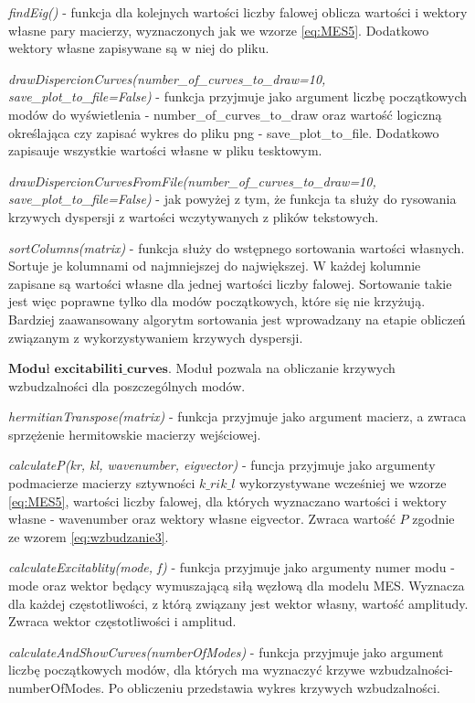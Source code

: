 \vspace {3mm}
\textit{findEig()} - funkcja dla kolejnych wartości liczby falowej oblicza wartości i wektory własne pary macierzy, wyznaczonych jak we wzorze \ref{eq:MES5}. Dodatkowo wektory własne zapisywane są w niej do pliku.

\vspace {3mm}
\textit{drawDispercionCurves(number\_of\_curves\_to\_draw=10, save\_plot\_to\_file=False)} - funkcja przyjmuje jako argument liczbę początkowych modów do wyświetlenia - number\_of\_curves\_to\_draw oraz wartość logiczną określająca czy zapisać wykres do pliku png - save\_plot\_to\_file. Dodatkowo zapisauje wszystkie wartości własne w pliku tesktowym.

\vspace {3mm}
\textit{drawDispercionCurvesFromFile(number\_of\_curves\_to\_draw=10, save\_plot\_to\_file=False)} - jak powyżej z tym, że funkcja ta służy do rysowania krzywych dyspersji z wartości wczytywanych z plików tekstowych.

\vspace {3mm}
\textit{sortColumns(matrix)} - funkcja służy do wstępnego sortowania wartości własnych. Sortuje je kolumnami od najmniejszej do największej. W każdej kolumnie zapisane są wartości własne dla jednej wartości liczby falowej. Sortowanie takie jest więc poprawne tylko dla modów początkowych, które się nie krzyżują. Bardziej zaawansowany algorytm sortowania jest wprowadzany na etapie obliczeń związanym z wykorzystywaniem krzywych dyspersji.

\vspace {3mm}
 \( \textbf{Moduł excitabiliti\_curves} \).
Moduł pozwala na obliczanie krzywych wzbudzalności dla poszczególnych modów. 

\vspace {3mm}
\textit{hermitianTranspose(matrix)} - funkcja przyjmuje jako argument macierz, a zwraca sprzężenie hermitowskie macierzy wejściowej.

\vspace {3mm}
\textit{calculateP(kr, kl, wavenumber, eigvector)} - funcja przyjmuje jako argumenty podmacierze macierzy sztywności \( k\_r i k\_l \) wykorzystywane wcześniej we wzorze \ref{eq:MES5}, wartości liczby falowej, dla których wyznaczano wartości i wektory własne - wavenumber oraz wektory własne eigvector. Zwraca wartość \( P \) zgodnie ze wzorem \ref{eq:wzbudzanie3}.

\vspace {3mm}
\textit{calculateExcitablity(mode, f)} - funkcja przyjmuje jako argumenty numer modu - mode oraz wektor będący wymuszającą siłą węzłową dla modelu MES. Wyznacza dla każdej częstotliwości, z którą związany jest wektor własny, wartość amplitudy. Zwraca wektor częstotliwości i amplitud.

\vspace {3mm}
\textit{calculateAndShowCurves(numberOfModes)} - funkcja przyjmuje jako argument liczbę początkowych modów, dla których ma wyznaczyć krzywe wzbudzalności- numberOfModes. Po obliczeniu przedstawia wykres krzywych wzbudzalności.

